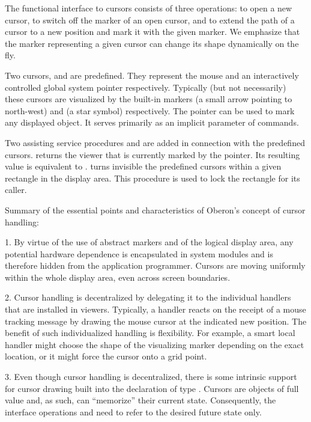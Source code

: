 The functional interface to cursors consists of three operations:
 to open a new cursor,  to switch off the marker
of an open cursor, and  to extend the path of a cursor to a
new position and mark it with the given marker. We emphasize that the
marker representing a given cursor can change its shape dynamically on
the fly.

Two cursors,  and  are predefined. They represent the
mouse and an interactively controlled global system pointer
respectively. Typically (but not necessarily) these cursors are
visualized by the built-in markers  (a small arrow pointing to
north-west) and  (a star symbol) respectively. The pointer can be
used to mark any displayed object. It serves primarily as an implicit
parameter of commands.

Two assisting service procedures  and  are
added in connection with the predefined cursors.  returns
the viewer that is currently marked by the pointer. Its resulting
value is equivalent to . 
turns invisible the predefined cursors within a given rectangle in the
display area. This procedure is used to lock the rectangle for its
caller.

Summary of the essential points and characteristics of Oberon's concept of cursor handling:

\item{1.} By virtue of the use of abstract markers and of the logical display area, any potential hardware dependence is encapsulated in system modules and is therefore hidden from the application programmer. Cursors are moving uniformly within the whole display area, even across screen boundaries.

\item{2.} Cursor handling is decentralized by delegating it to the individual handlers that are installed in viewers. Typically, a handler reacts on the receipt of a mouse tracking message by drawing the mouse cursor at the indicated new position. The benefit of such individualized handling is flexibility. For example, a smart local handler might choose the shape of the visualizing marker depending on the exact location, or it might force the cursor onto a grid point.

\item{3.} Even though cursor handling is decentralized, there is some intrinsic support for cursor drawing built into the declaration of type . Cursors are objects of full value and, as such, can ``memorize'' their current state. Consequently, the interface operations  and  need to refer to the desired future state only.

